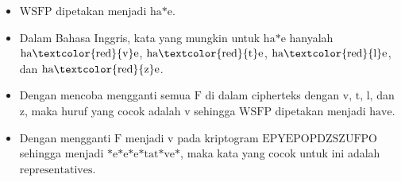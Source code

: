 \documentclass{article}
\begin{document}

\begin{itemize}
    \item $\text{WSFP}$ dipetakan menjadi $\text{ha*e}$.
    \item Dalam Bahasa Inggris, kata yang mungkin untuk $\text{ha*e}$ hanyalah $\text{ha\textcolor{red}{v}e}$, $\text{ha\textcolor{red}{t}e}$, $\text{ha\textcolor{red}{l}e}$, dan $\text{ha\textcolor{red}{z}e}$.
    \item Dengan mencoba mengganti semua $\text{F}$ di dalam cipherteks dengan $\text{v, t, l,}$ dan $\text{z}$, maka huruf yang cocok adalah $\text{v}$ sehingga $\text{WSFP}$ dipetakan menjadi $\text{have}$.
    \item Dengan mengganti $\text{F}$ menjadi $\text{v}$ pada kriptogram $\text{EPYEPOPDZSZUFPO}$ sehingga menjadi $\text{*e*e*e*tat*ve*}$, maka kata yang cocok untuk ini adalah $\text{representatives}$.
\end{itemize}
\end{document}
